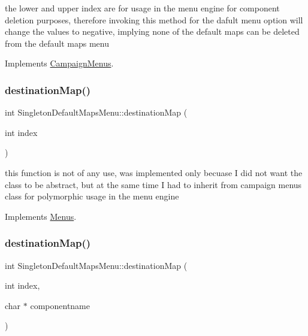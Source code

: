 the lower and upper index are for usage in the menu engine for component deletion purposes, therefore invoking this method for the dafult menu option will change the values to negative, implying none of the default maps can be deleted from the default maps menu 

Implements \hyperlink{class_campaign_menus}{Campaign\+Menus}.

\hypertarget{class_singleton_default_maps_menu_ae1fbaf884313cf1efe755f480c505062}{}\label{class_singleton_default_maps_menu_ae1fbaf884313cf1efe755f480c505062} 
\subsubsection{\texorpdfstring{destination\+Map()}{destinationMap()}\hspace{0.1cm}{\footnotesize\ttfamily [1/2]}}
{\footnotesize\ttfamily int Singleton\+Default\+Maps\+Menu\+::destination\+Map (\begin{DoxyParamCaption}\item[{int}]{index }\end{DoxyParamCaption})\hspace{0.3cm}{\ttfamily [virtual]}}

this function is not of any use, was implemented only becuase I did not want the class to be abstract, but at the same time I had to inherit from campaign menus class for polymorphic usage in the menu engine 

Implements \hyperlink{class_menus}{Menus}.

\hypertarget{class_singleton_default_maps_menu_ae72d52564efb81a41fe9f2ee648fe691}{}\label{class_singleton_default_maps_menu_ae72d52564efb81a41fe9f2ee648fe691} 
\subsubsection{\texorpdfstring{destination\+Map()}{destinationMap()}\hspace{0.1cm}{\footnotesize\ttfamily [2/2]}}
{\footnotesize\ttfamily int Singleton\+Default\+Maps\+Menu\+::destination\+Map (\begin{DoxyParamCaption}\item[{int}]{index,  }\item[{char $\ast$}]{componentname }\end{DoxyParamCaption})\hspace{0.3cm}{\ttfamily [virtual]}}

